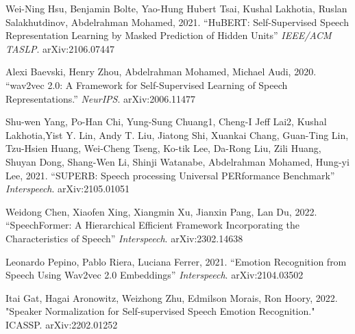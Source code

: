 \documentclass[11pt, letterpaper]{article}
\begin{document}
\begin{enumerate}[label={[\arabic*]},leftmargin=*]
  \item Wei-Ning Hsu, Benjamin Bolte, Yao-Hung Hubert Tsai, Kushal Lakhotia,
Ruslan Salakhutdinov, Abdelrahman Mohamed, 2021. ``HuBERT: Self-Supervised Speech Representation
Learning by Masked Prediction of Hidden Units'' \textit{IEEE/ACM TASLP}. arXiv:2106.07447
  \item Alexi Baevski, Henry Zhou, Abdelrahman Mohamed, Michael Audi, 2020. ``wav2vec 2.0: A Framework for Self-Supervised Learning of Speech Representations.'' \textit{NeurIPS}. arXiv:2006.11477
  \item Shu-wen Yang, Po-Han Chi, Yung-Sung Chuang1, Cheng-I Jeff Lai2, Kushal Lakhotia,Yist Y. Lin, Andy T. Liu, Jiatong Shi, Xuankai Chang, Guan-Ting Lin, Tzu-Hsien Huang, Wei-Cheng Tseng, Ko-tik Lee, Da-Rong Liu, Zili Huang, Shuyan Dong, Shang-Wen Li, Shinji Watanabe, Abdelrahman Mohamed, Hung-yi Lee, 2021. ``SUPERB: Speech processing Universal PERformance Benchmark'' \textit{Interspeech}. arXiv:2105.01051
  \item Weidong Chen, Xiaofen Xing, Xiangmin Xu, Jianxin Pang, Lan Du, 2022. ``SpeechFormer: A Hierarchical Efficient Framework Incorporating the Characteristics of Speech'' \textit{Interspeech}. arXiv:2302.14638
  \item Leonardo Pepino, Pablo Riera, Luciana Ferrer, 2021. ``Emotion Recognition from Speech Using Wav2vec 2.0 Embeddings'' \textit{Interspeech}. arXiv:2104.03502
  

  \item Itai Gat, Hagai Aronowitz, Weizhong Zhu, Edmilson Morais, Ron Hoory, 2022. "Speaker Normalization for Self-supervised Speech Emotion Recognition." ICASSP. arXiv:2202.01252
\end{enumerate}
\end{document}
